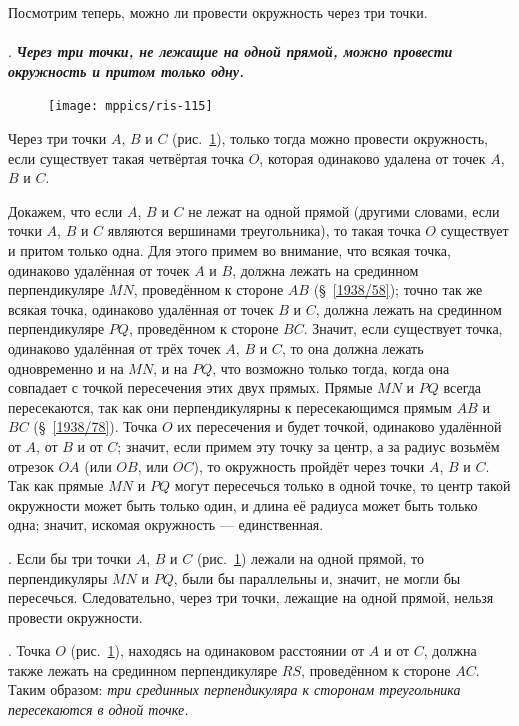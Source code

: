 \documentclass[oneside]{book}
\begin{document}
Посмотрим теперь, можно ли провести окружность через три точки.

\paragraph{}\label{1938/104}
.
\textbf{\emph{Через три точки, не лежащие на одной прямой, можно провести окружность и притом только одну.}}

\begin{figure}
\centering
\texttt{[image: mppics/ris-115]}
\caption{}\label{1938/ris-115}
\end{figure}

Через три точки $A$, $B$ и $C$ (рис.~\ref{1938/ris-115}), только тогда можно провести окружность, если существует такая четвёртая точка $O$, которая одинаково удалена от точек $A$, $B$ и $C$.

Докажем, что если $A$, $B$ и $C$ не лежат на одной прямой 
(другими словами, если точки $A$, $B$ и $C$ являются вершинами треугольника),
то такая точка $O$ существует и притом только одна.
Для этого примем во внимание, что всякая точка, одинаково удалённая от точек $A$ и $B$, должна лежать на срединном перпендикуляре $MN$, проведённом к стороне $AB$ (§~\ref{1938/58}); 
точно так же всякая точка, одинаково удалённая от точек $B$ и $C$, должна лежать на срединном перпендикуляре $PQ$, проведённом к стороне $BC$.
Значит, если существует точка, одинаково удалённая от трёх точек $A$, $B$ и $C$, то она должна лежать одновременно и на $MN$, и на $PQ$, что возможно только тогда, когда она совпадает с точкой пересечения этих двух прямых.
Прямые $MN$ и $PQ$ всегда пересекаются, так как они перпендикулярны к пересекающимся прямым $AB$ и $BC$ (§~\ref{1938/78}).
Точка $O$ их пересечения и будет точкой, одинаково удалённой от $A$, от $B$ и от $C$;
значит, если примем эту точку за центр, а за радиус возьмём отрезок $OA$ (или $OB$, или $OC$), то окружность пройдёт через точки $A$, $B$ и $C$.
Так как прямые $MN$ и $PQ$ могут пересечься только в одной точке, то центр такой окружности может быть только один, и длина её радиуса может быть только одна;
значит, искомая окружность — единственная.

.
Если бы три точки $A$, $B$ и $C$ (рис.~\ref{1938/ris-115}) лежали на одной прямой, то перпендикуляры $MN$ и $PQ$, были бы параллельны и, значит, не могли бы пересечься.
Следовательно, через три точки, лежащие на одной прямой, нельзя провести окружности.

.
Точка $O$ (рис.~\ref{1938/ris-115}), находясь на одинаковом расстоянии от $A$ и от $C$, должна также лежать на срединном перпендикуляре $RS$, проведённом к стороне $AC$. 
Таким образом:
\emph{три срединных перпендикуляра к сторонам треугольника пересекаются в одной точке.}
\end{document}
